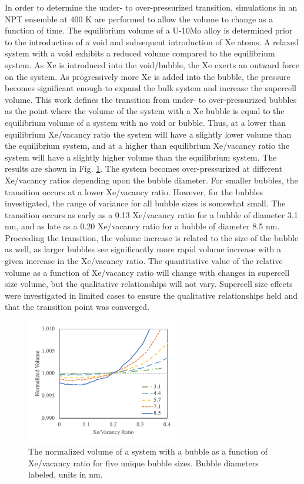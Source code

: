 \documentclass[review]{elsarticle}
\providecommand{\DIFaddtex}[1]{{\protect\color{blue} \sf #1}} %
\providecommand{\DIFaddbegin}{} %
\providecommand{\DIFaddend}{} %
\providecommand{\DIFadd}[1]{\texorpdfstring{\DIFaddtex{#1}}{#1}} %
\newcommand{\DIFaddincludegraphics}[2][]{{\color{blue}\fbox{\DIFOincludegraphics[#1]{#2}}}} %
\DeclareRobustCommand{\DIFaddbegin}{\DIFOaddbegin \let\includegraphics\DIFaddincludegraphics} %
\DeclareRobustCommand{\DIFaddend}{\DIFOaddend \let\includegraphics\DIFOincludegraphics} %
\begin{document}
In order to determine the under- to over-pressurized transition, simulations in an NPT ensemble at 400 K are performed to allow the volume to change as a function of time. The equilibrium volume of a U-10Mo alloy is determined prior to the introduction of a void and subsequent introduction of Xe atoms. A relaxed system with a void exhibits a reduced volume compared to the equilibrium system. As Xe is introduced into the void/bubble, the Xe exerts an outward force on the system. As progressively more Xe is added into the bubble, the pressure becomes significant enough to expand the bulk system and increase the supercell volume. This work defines the transition from under- to over-pressurized bubbles as the point where the volume of the system with a Xe bubble is equal to the equilibrium volume of a system with no void or bubble. Thus, at a lower than equilibrium Xe/vacancy ratio the system will have a slightly lower volume than the equilibrium system, and at a higher than equilibrium Xe/vacancy ratio the system will have a slightly higher volume than the equilibrium system. The results are shown in Fig. \ref{fig:delV}. The system becomes over-pressurized at different Xe/vacancy ratios depending upon the bubble diameter. For smaller bubbles, the transition occurs at a lower Xe/vacancy ratio. However, for the bubbles investigated, the range of variance for all bubble sizes is somewhat small. The transition occurs as early as a 0.13 Xe/vacancy ratio for a bubble of diameter 3.1 nm, and as late as a 0.20 Xe/vacancy ratio for a bubble of diameter 8.5 nm. Proceeding the transition, the volume increase is related to the size of the bubble as well, as larger bubbles see significantly more rapid volume increase with a given increase in the Xe/vacancy ratio. \DIFaddbegin \DIFadd{The quantitative value of the relative volume as a function of Xe/vacancy ratio will change with changes in supercell size volume, but the qualitative relationships will not vary. Supercell size effects were investigated in limited cases to ensure the qualitative relationships held and that the transition point was converged. 
}\DIFaddend 

\begin{figure}[h]
 \centering
 \includegraphics[width=0.6\textwidth]{5_delV.png} 
 \caption{The normalized volume of a system with a bubble as a function of Xe/vacancy ratio for five unique bubble sizes. Bubble diameters labeled, units in nm.}
 \label{fig:delV}
\end{figure}
\end{document}
